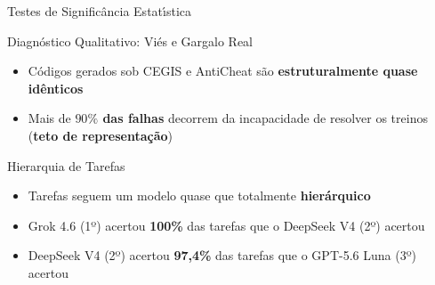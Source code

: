 \documentclass[aspectratio=169, 10pt]{beamer}
\begin{document}
\begin{frame}{Testes de Signific\^{a}ncia Estat\'{\i}stica}
    \centering
    \vspace{0.8em}
\end{frame}

\begin{frame}{Diagn\'{o}stico Qualitativo: Vi\'{e}s e Gargalo Real}
    \vspace{1.0em}
    \begin{itemize}\setlength{\itemsep}{1.1em}
        \item C\'{o}digos gerados sob CEGIS e AntiCheat s\~{a}o \textbf{estruturalmente quase id\^{e}nticos}
        \item Mais de \textbf{$90\%$ das falhas} decorrem da incapacidade de resolver os treinos (\textbf{teto de representa\c{c}\~{a}o})
    \end{itemize}
\end{frame}

\begin{frame}{Hierarquia de Tarefas}
    \vspace{1.0em}
    \begin{itemize}\setlength{\itemsep}{1.1em}
        \item Tarefas seguem um modelo quase que totalmente \textbf{hierárquico}
        \item Grok 4.6 (1º) acertou \textbf{100\%} das tarefas que o DeepSeek V4 (2º) acertou
        \item DeepSeek V4 (2º) acertou \textbf{97,4\%} das tarefas que o GPT-5.6 Luna (3º) acertou
    \end{itemize}
\end{frame}
\end{document}
